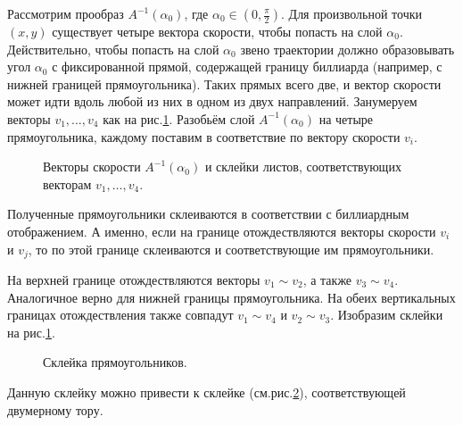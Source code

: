 \begin{example}
    Рассмотрим прообраз $A^{-1}(\alpha_0)$, где $\alpha_0 \in \left(0, \frac{\pi}{2}\right)$. Для произвольной точки $(x,y)$ существует четыре вектора скорости, чтобы попасть на слой $\alpha_0$. Действительно, чтобы попасть на слой $\alpha_0$ звено траектории должно образовывать угол $\alpha_0$ с фиксированной прямой, содержащей границу биллиарда (например, с нижней границей прямоугольника). Таких прямых всего две, и вектор скорости может идти вдоль любой из них в одном из двух направлений. Занумеруем векторы $v_1, \dots, v_4$ как на рис.\ref{fig:c15.6}. Разобьём слой $A^{-1}(\alpha_0)$ на четыре прямоугольника, каждому поставим в соответствие по вектору скорости $v_i$.

    \begin{figure}[ht]
        \centering
        \caption{Векторы скорости $A^{-1}(\alpha_0)$ и склейки листов, соответствующих векторам $v_1, \dots, v_4$.}
        \label{fig:c15.6}
    \end{figure}

    Полученные прямоугольники склеиваются в соответствии с биллиардным отображением. А именно, если на границе отождествляются векторы скорости $v_i$ и $v_j$, то по этой границе склеиваются и соответствующие им прямоугольники.

    На верхней границе отождествляются векторы $v_1 \sim v_2$, а также $v_3 \sim v_4$. Аналогичное верно для нижней границы прямоугольника. На обеих вертикальных границах отождествления также совпадут $v_1 \sim v_4$ и $v_2 \sim v_3$. 
    Изобразим склейки на рис.\ref{fig:c15.6}.

    \begin{figure}[ht]
        \centering
        \caption{Склейка прямоугольников.}
        \label{fig:c15.7}
    \end{figure}

    Данную склейку можно привести к склейке (см.рис.\ref{fig:c15.7}), соответствующей двумерному тору.
\end{example}